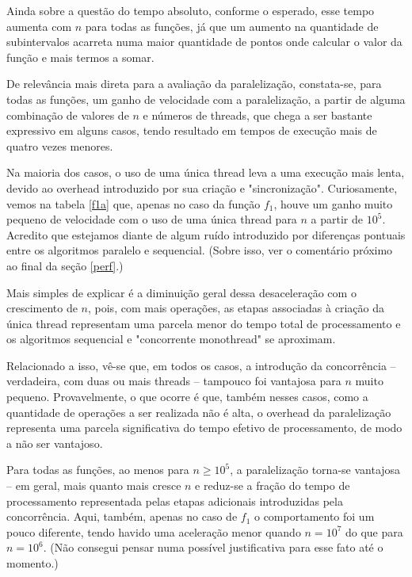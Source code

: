 \documentclass{article}
\begin{document}
  Ainda sobre a questão do tempo absoluto, conforme o esperado, esse tempo aumenta com $n$ para todas as funções, já que um aumento na quantidade de subintervalos acarreta numa maior quantidade de pontos onde calcular o valor da função e mais termos a somar.

  De relevância mais direta para a avaliação da paralelização, constata-se, para todas as funções, um ganho de velocidade com a paralelização, a partir de alguma combinação de valores de $n$ e números de threads, que chega a ser bastante expressivo em alguns casos, tendo resultado em tempos de execução mais de quatro vezes menores.

  Na maioria dos casos, o uso de uma única thread leva a uma execução mais lenta, devido ao overhead introduzido por sua criação e "sincronização". Curiosamente, vemos na tabela \ref{f1a} que, apenas no caso da função $f_1$, houve um ganho muito pequeno de velocidade com o uso de uma única thread para $n$ a partir de $10^5$. Acredito que estejamos diante de algum ruído introduzido por diferenças pontuais entre os algoritmos paralelo e sequencial. (Sobre isso, ver o comentário próximo ao final da seção \ref{perf}.)
  
  Mais simples de explicar é a diminuição geral dessa desaceleração com o crescimento de $n$, pois, com mais operações, as etapas associadas à criação da única thread representam uma parcela menor do tempo total de processamento e os algoritmos sequencial e "concorrente monothread" se aproximam.

  Relacionado a isso, vê-se que, em todos os casos, a introdução da concorrência -- verdadeira, com duas ou mais threads -- tampouco foi vantajosa para $n$ muito pequeno. Provavelmente, o que ocorre é que, também nesses casos, como a quantidade de operações a ser realizada não é alta, o overhead da paralelização representa uma parcela significativa do tempo efetivo de processamento, de modo a não ser vantajoso.

  Para todas as funções, ao menos para $n \geq 10^5$, a paralelização torna-se vantajosa -- em geral, mais quanto mais cresce $n$ e reduz-se a fração do tempo de processamento representada pelas etapas adicionais introduzidas pela concorrência. Aqui, também, apenas no caso de $f_1$ o comportamento foi um pouco diferente, tendo havido uma aceleração menor quando $n = 10^7$ do que para $n = 10^6$. (Não consegui pensar numa possível justificativa para esse fato até o momento.)

\end{document}
